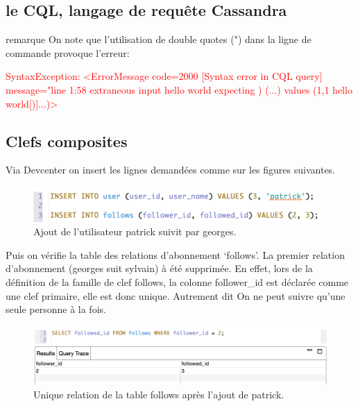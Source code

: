 \subsection{le CQL, langage de requête Cassandra}


\par 
\begin{block}{remarque}
On note que l\rq utilisation de double quotes (") dans la ligne de commande provoque l'erreur: \newline
\begin{tt}
\textcolor{red}{
SyntaxException: <ErrorMessage code=2000 [Syntax error in CQL query]
message="line 1:58 extraneous input hello world expecting ) (...) values (1,1 hello world[)]...)>
}
\end{tt}
\end{block}

\subsection{Clefs composites}
Via Devcenter on insert les lignes demandées comme sur les figures suivantes. \newline
\begin{figure}[h!]
\centering
\includegraphics[scale=0.7]{img/add_patrick.png}
\caption{Ajout de l'utilisateur patrick suivit par georges.}
\end{figure}

Puis on vérifie la table des relations d'abonnement \lq follows\rq.
La premier relation d'abonnement (georges suit sylvain) à été supprimée.
En effet, lors de la définition de la famille de clef follows, la colonne
follower\_id est déclarée comme une clef primaire, elle est donc unique. Autrement dit
On ne peut suivre qu'une seule personne à la fois.
\begin{figure}[h!]
\centering
\includegraphics[scale=0.6]{img/solo_key.png}
\caption{Unique relation de la table follows après l'ajout de patrick.}
\end{figure}


